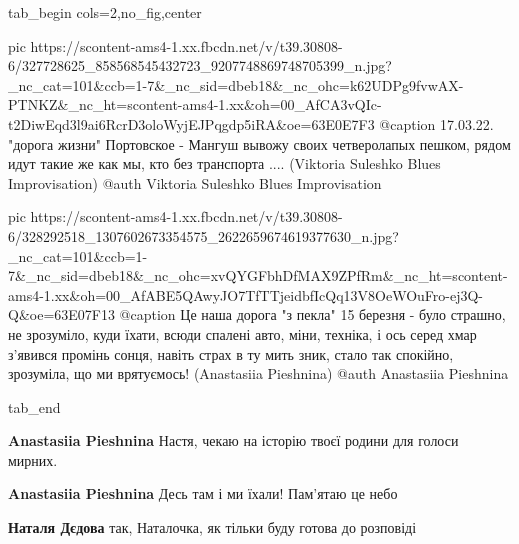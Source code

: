 \begin{center}
\begin{minipage}{\textwidth}

\ifcmt
  tab_begin cols=2,no_fig,center

     pic https://scontent-ams4-1.xx.fbcdn.net/v/t39.30808-6/327728625_858568545432723_9207748869748705399_n.jpg?_nc_cat=101&ccb=1-7&_nc_sid=dbeb18&_nc_ohc=k62UDPg9fvwAX-PTNKZ&_nc_ht=scontent-ams4-1.xx&oh=00_AfCA3vQIc-t2DiwEqd3l9ai6RcrD3oloWyjEJPqgdp5iRA&oe=63E0E7F3
     @caption 17.03.22. "дорога жизни" Портовское - Мангуш вывожу своих четверолапых пешком, рядом идут такие же как мы, кто без транспорта .... (Viktoria Suleshko Blues Improvisation)
     @auth Viktoria Suleshko Blues Improvisation

     pic https://scontent-ams4-1.xx.fbcdn.net/v/t39.30808-6/328292518_1307602673354575_2622659674619377630_n.jpg?_nc_cat=101&ccb=1-7&_nc_sid=dbeb18&_nc_ohc=xvQYGFbhDfMAX9ZPfRm&_nc_ht=scontent-ams4-1.xx&oh=00_AfABE5QAwyJO7TfTTjeidbfIcQq13V8OeWOuFro-ej3Q-Q&oe=63E07F13
     @caption Це наша дорога "з пекла" 15 березня - було страшно, не зрозуміло, куди їхати, всюди спалені авто, міни, техніка, і ось серед хмар з'явився промінь сонця, навіть страх в ту мить зник, стало так спокійно, зрозуміла, що ми врятуємось! (Anastasiia Pieshnina)
     @auth Anastasiia Pieshnina


  tab_end
\fi
\end{minipage}
\end{center}

\begin{itemize} %
\textbf{Anastasiia Pieshnina} Настя, чекаю на історію твоєї родини для голоси мирних.

\textbf{Anastasiia Pieshnina} Десь там і ми їхали! Пам'ятаю це небо🙌

\textbf{Наталя Дєдова} так, Наталочка, як тільки буду готова до розповіді
\end{itemize} %

